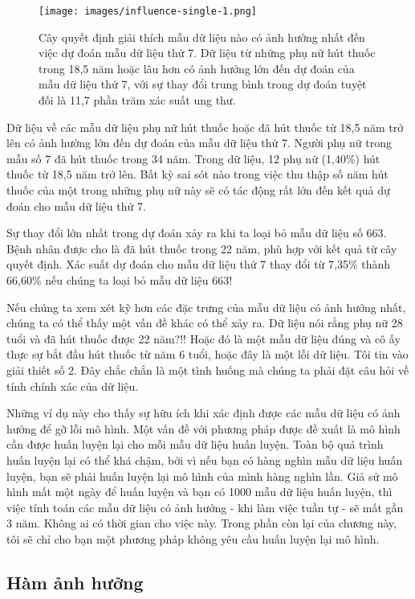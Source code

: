 \begin{figure}[h!]
    \centering
    \texttt{[image: images/influence-single-1.png]}
    \caption{Cây quyết định giải thích mẫu dữ liệu nào có ảnh hưởng nhất đến việc dự đoán mẫu dữ liệu thứ 7. Dữ liệu từ những phụ nữ hút thuốc trong 18,5 năm hoặc lâu hơn có ảnh hưởng lớn đến dự đoán của mẫu dữ liệu thứ 7, với sự thay đổi trung bình trong dự đoán tuyệt đối là 11,7 phần trăm xác suất ung thư.}
    \label{fig:6_15}
\end{figure}

Dữ liệu về các mẫu dữ liệu phụ nữ hút thuốc hoặc đã hút thuốc từ 18,5 năm trở lên có ảnh hưởng lớn đến dự đoán của mẫu dữ liệu thứ 7. Người phụ nữ trong mẫu số 7 đã hút thuốc trong 34 năm. Trong dữ liệu, 12 phụ nữ (1,40\%) hút thuốc từ 18,5 năm trở lên. Bất kỳ sai sót nào trong việc thu thập số năm hút thuốc của một trong những phụ nữ này sẽ có tác động rất lớn đến kết quả dự đoán cho mẫu dữ liệu thứ 7.

Sự thay đổi lớn nhất trong dự đoán xảy ra khi ta loại bỏ mẫu dữ liệu số 663. Bệnh nhân được cho là đã hút thuốc trong 22 năm, phù hợp với kết quả từ cây quyết định. Xác suất dự đoán cho mẫu dữ liệu thứ 7 thay đổi từ 7,35\% thành 66,60\% nếu chúng ta loại bỏ mẫu dữ liệu 663!

Nếu chúng ta xem xét kỹ hơn các đặc trưng của mẫu dữ liệu có ảnh hưởng nhất, chúng ta có thể thấy một vấn đề khác có thể xảy ra. Dữ liệu nói rằng phụ nữ 28 tuổi và đã hút thuốc được 22 năm?!! Hoặc đó là một mẫu dữ liệu đúng và cô ấy thực sự bắt đầu hút thuốc từ năm 6 tuổi, hoặc đây là một lỗi dữ liệu. Tôi tin vào giải thiết số 2. Đây chắc chắn là một tình huống mà chúng ta phải đặt câu hỏi về tính chính xác của dữ liệu.

Những ví dụ này cho thấy sự hữu ích khi xác định được các mẫu dữ liệu có ảnh hưởng để gỡ lỗi mô hình. Một vấn đề với phương pháp được đề xuất là mô hình cần được huấn luyện lại cho mỗi mẫu dữ liệu huấn luyện. Toàn bộ quá trình huấn luyện lại có thể khá chậm, bởi vì nếu bạn có hàng nghìn mẫu dữ liệu huấn luyện, bạn sẽ phải huấn luyện lại mô hình của mình hàng nghìn lần. Giả sử mô hình mất một ngày để huấn luyện và bạn có 1000 mẫu dữ liệu huấn luyện, thì việc tính toán các mẫu dữ liệu có ảnh hưởng - khi làm việc tuần tự - sẽ mất gần 3 năm. Không ai có thời gian cho việc này. Trong phần còn lại của chương này, tôi sẽ chỉ cho bạn một phương pháp không yêu cầu huấn luyện lại mô hình.

\subsection{Hàm ảnh hưởng}

